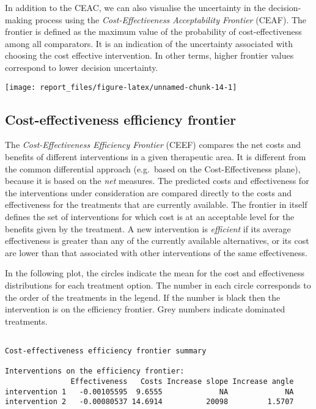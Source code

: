 \documentclass[
]{article}
\begin{document}
In addition to the CEAC, we can also visualise the uncertainty in the
decision-making process using the \emph{Cost-Effectiveness Acceptability
Frontier} (CEAF). The frontier is defined as the maximum value of the
probability of cost-effectiveness among all comparators. It is an
indication of the uncertainty associated with choosing the cost
effective intervention. In other terms, higher frontier values
correspond to lower decision uncertainty.

\begin{center}\texttt{[image: report\_files/figure-latex/unnamed-chunk-14-1]} \end{center}

\hypertarget{cost-effectiveness-efficiency-frontier}{%
\subsection{Cost-effectiveness efficiency
frontier}\label{cost-effectiveness-efficiency-frontier}}

The \emph{Cost-Effectiveness Efficiency Frontier} (CEEF) compares the
net costs and benefits of different interventions in a given therapeutic
area. It is different from the common differential approach (e.g.~based
on the Cost-Effectiveness plane), because it is based on the \emph{net}
measures. The predicted costs and effectiveness for the interventions
under consideration are compared directly to the costs and effectiveness
for the treatments that are currently available. The frontier in itself
defines the set of interventions for which cost is at an acceptable
level for the benefits given by the treatment. A new intervention is
\emph{efficient} if its average effectiveness is greater than any of the
currently available alternatives, or its cost are lower than that
associated with other interventions of the same effectiveness.

In the following plot, the circles indicate the mean for the cost and
effectiveness distributions for each treatment option. The number in
each circle corresponds to the order of the treatments in the legend. If
the number is black then the intervention is on the efficiency frontier.
Grey numbers indicate dominated treatments.

\begin{verbatim}

Cost-effectiveness efficiency frontier summary 

Interventions on the efficiency frontier:
               Effectiveness   Costs Increase slope Increase angle
intervention 1   -0.00105595  9.6555             NA             NA
intervention 2   -0.00080537 14.6914          20098         1.5707
\end{verbatim}
\end{document}
